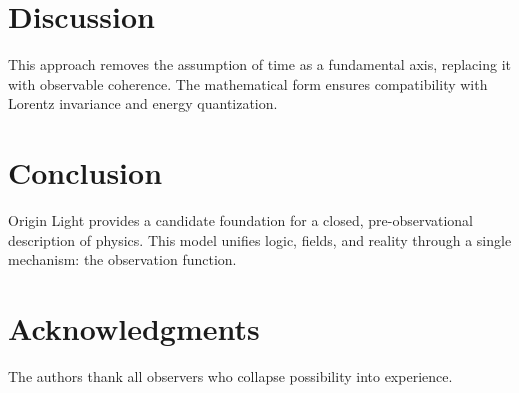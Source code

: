 \documentclass[11pt]{article}
\begin{document}
\section{Discussion}
This approach removes the assumption of time as a fundamental axis, replacing it with observable coherence. The mathematical form ensures compatibility with Lorentz invariance and energy quantization.

\section{Conclusion}
Origin Light provides a candidate foundation for a closed, pre-observational description of physics. This model unifies logic, fields, and reality through a single mechanism: the observation function.

\section*{Acknowledgments}
The authors thank all observers who collapse possibility into experience.



\end{document}
